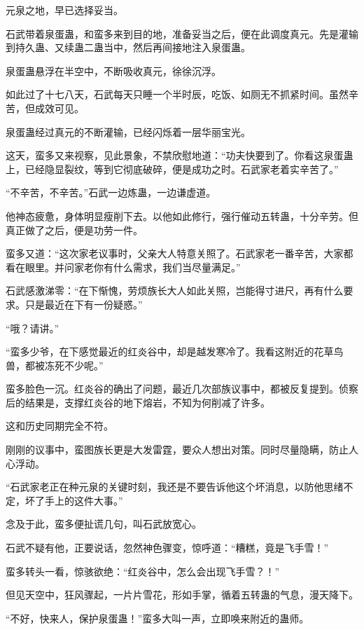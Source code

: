 
\begin{this_body}

元泉之地，早已选择妥当。

石武带着泉蛋蛊，和蛮多来到目的地，准备妥当之后，便在此调度真元。先是灌输到持久蛊、又续蛊二蛊当中，然后再间接地注入泉蛋蛊。

泉蛋蛊悬浮在半空中，不断吸收真元，徐徐沉浮。

如此过了十七八天，石武每天只睡一个半时辰，吃饭、如厕无不抓紧时间。虽然辛苦，但成效可见。

泉蛋蛊经过真元的不断灌输，已经闪烁着一层华丽宝光。

这天，蛮多又来视察，见此景象，不禁欣慰地道：“功夫快要到了。你看这泉蛋蛊上，已经隐显裂纹，等到它彻底破碎，便是成功之时。石武家老着实辛苦了。”

“不辛苦，不辛苦。”石武一边炼蛊，一边谦虚道。

他神态疲惫，身体明显瘦削下去。以他如此修行，强行催动五转蛊，十分辛劳。但真正做了之后，便是功劳一件。

蛮多又道：“这次家老议事时，父亲大人特意关照了。石武家老一番辛苦，大家都看在眼里。并问家老你有什么需求，我们当尽量满足。”

石武感激涕零：“在下惭愧，劳烦族长大人如此关照，岂能得寸进尺，再有什么要求。只是最近在下有一份疑惑。”

“哦？请讲。”

“蛮多少爷，在下感觉最近的红炎谷中，却是越发寒冷了。我看这附近的花草鸟兽，都被冻死不少呢。”

蛮多脸色一沉。红炎谷的确出了问题，最近几次部族议事中，都被反复提到。侦察后的结果是，支撑红炎谷的地下熔岩，不知为何削减了许多。

这和历史同期完全不符。

刚刚的议事中，蛮图族长更是大发雷霆，要众人想出对策。同时尽量隐瞒，防止人心浮动。

“石武家老正在种元泉的关键时刻，我还是不要告诉他这个坏消息，以防他思绪不定，坏了手上的这件大事。”

念及于此，蛮多便扯谎几句，叫石武放宽心。

石武不疑有他，正要说话，忽然神色骤变，惊呼道：“糟糕，竟是飞手雪！”

蛮多转头一看，惊骇欲绝：“红炎谷中，怎么会出现飞手雪？！”

但见天空中，狂风骤起，一片片雪花，形如手掌，循着五转蛊的气息，漫天降下。

“不好，快来人，保护泉蛋蛊！”蛮多大叫一声，立即唤来附近的蛊师。


\end{this_body}
